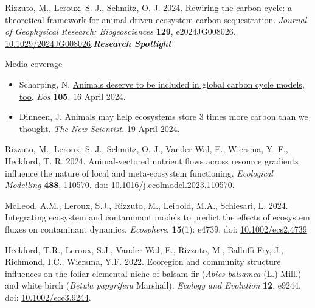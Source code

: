 \begin{etaremune}[topsep=0pt,itemsep=1pt,partopsep=0pt,parsep=0pt]
  \renewcommand\labelenumi{\bfseries\theenumi .}
  \item \textcolor{awesome}{Rizzuto, M.}, Leroux, S. J., Schmitz, O. J. 2024. Rewiring the carbon cycle: a theoretical framework for animal-driven ecosystem carbon sequestration. \emph{Journal of Geophysical Research: Biogeosciences} \textbf{129}, e2024JG008026. \href{https://agupubs.onlinelibrary.wiley.com/doi/epdf/10.1029/2024JG008026?domain=author&token=JQVUWF9NSSQKUTSE44C6}{10.1029/2024JG008026}.\null\hfill\textbf{\textit{Research Spotlight}}
  \vspace{.3em}
  \begin{description}
    \item[\small \bodyfontlight Media coverage]
  \end{description}
  \begin{itemize}
    \footnotesize
      \item Scharping, N. \href{https://doi.org/10.1029/2024EO240170}{Animals deserve to be included in global carbon cycle models, too}. \emph{Eos} \textbf{105}. 16 April 2024.
      \item Dinneen, J. \href{https://www.newscientist.com/article/2427674-animals-may-help-ecosystems-store-3-times-more-carbon-than-we-thought/}{Animals may help ecosystems store 3 times more carbon than we thought}. \emph{The New Scientist}. 19 April 2024.
  \end{itemize}
  \item \textcolor{awesome}{Rizzuto, M.}, Leroux, S. J., Schmitz, O. J., Vander Wal, E., Wiersma, Y. F., Heckford, T. R. 2024. Animal-vectored nutrient flows across resource gradients influence the nature of local and meta-ecosystem functioning. \emph{Ecological Modelling} \textbf{488}, 110570. doi: \href{https://doi.org/10.1016/j.ecolmodel.2023.110570}{10.1016/j.ecolmodel.2023.110570}.
  \item McLeod, A.M., Leroux, S.J., \textcolor{awesome}{Rizzuto, M.}, Leibold, M.A., Schiesari, L. 2024. Integrating ecosystem and contaminant models to predict the effects of ecosystem fluxes on contaminant dynamics. \emph{Ecosphere}, \textbf{15}(1): e4739. doi: \href{https://doi.org/10.1002/ecs2.4739}{10.1002/ecs2.4739}
  \item Heckford, T.R., Leroux, S.J., Vander Wal, E., \textcolor{awesome}{Rizzuto, M.}, Balluffi-Fry, J., Richmond, I.C., Wiersma, Y.F. 2022. Ecoregion and community structure influences on the foliar elemental niche of balsam fir (\textit{Abies balsamea} (L.) Mill.) and white birch (\textit{Betula papyrifera} Marshall). \emph{Ecology and Evolution} \textbf{12}, e9244. doi: \href{https://doi.org/10.1002/ece3.9244}{10.1002/ece3.9244}.

\end{etaremune}
